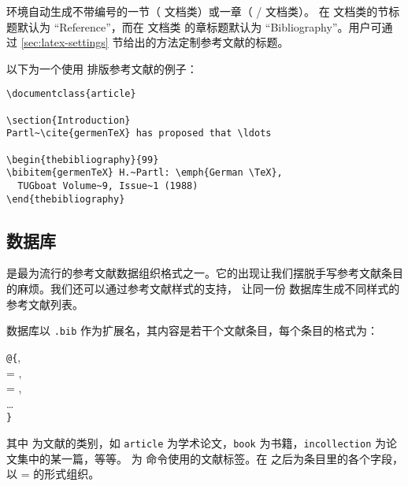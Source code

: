  环境自动生成不带编号的一节（ 文档类）或一章（ /  文档类）。
在  文档类的节标题默认为 ``Reference''{}，而在  文档类
的章标题默认为 ``Bibliography''{}。用户可通过 \ref{sec:latex-settings} 节给出的方法定制参考文献的标题。

以下为一个使用  排版参考文献的例子：
\begin{verbatim}
\documentclass{article}

\section{Introduction}
Partl~\cite{germenTeX} has proposed that \ldots

\begin{thebibliography}{99}
\bibitem{germenTeX} H.~Partl: \emph{German \TeX},
  TUGboat Volume~9, Issue~1 (1988)
\end{thebibliography}

\end{verbatim}

\subsection{ 数据库}\label{subsec:bibtex-data}

 是最为流行的参考文献数据组织格式之一。它的出现让我们摆脱手写参考文献条目的麻烦。我们还可以通过参考文献样式的支持，
让同一份  数据库生成不同样式的参考文献列表。

 数据库以 \texttt{.bib} 作为扩展名，其内容是若干个文献条目，每个条目的格式为：
\begin{command}
\texttt @\texttt\{, \\
\qquad{} = , \\
\qquad{} = , \\
\qquad\ldots\\
\texttt\}
\end{command}

其中  为文献的类别，如 \texttt{article} 为学术论文，\texttt{book} 为书籍，\texttt{in\-collection} 为论文集中的某一篇，等等。
 为  命令使用的文献标签。在  之后为条目里的各个字段，以  =  的形式组织。


